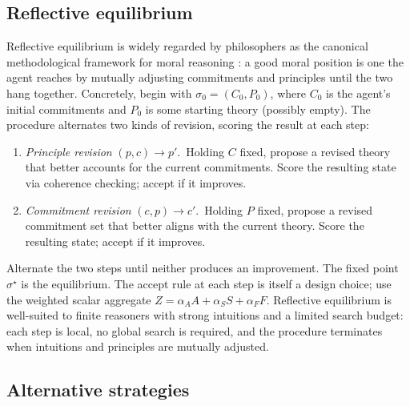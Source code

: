 \documentclass{article}
\begin{document}
\subsection{Reflective equilibrium}

Reflective equilibrium is widely regarded by philosophers as the canonical
methodological framework for moral reasoning
\citep{rawls1971,knight2023}: a good moral position is one the agent
reaches by mutually adjusting commitments and principles until the two
hang together. Concretely, begin with $\sigma_0 = (C_0, P_0)$, where $C_0$
is the agent's initial commitments and $P_0$ is some starting theory
(possibly empty). The procedure alternates two kinds of revision, scoring
the result at each step:
\begin{enumerate}[leftmargin=*, itemsep=2pt, label=(\arabic*)]
  \item \emph{Principle revision} \;$(p, c) \to p'$.\, Holding $C$ fixed,
    propose a revised theory that better accounts for the current
    commitments. Score the resulting state via coherence checking; accept
    if it improves.
  \item \emph{Commitment revision} \;$(c, p) \to c'$.\, Holding $P$ fixed,
    propose a revised commitment set that better aligns with the current
    theory. Score the resulting state; accept if it improves.
\end{enumerate}
Alternate the two steps until neither produces an improvement. The fixed
point $\sigma^\star$ is the equilibrium. The accept rule at each step is
itself a design choice; \citet{beisbart2021} use the weighted scalar
aggregate $Z = \alpha_A A + \alpha_S S + \alpha_F F$. Reflective
equilibrium is well-suited to finite reasoners with strong intuitions and
a limited search budget: each step is local, no global search is
required, and the procedure terminates when intuitions and principles are
mutually adjusted.

\subsection{Alternative strategies}
\end{document}
